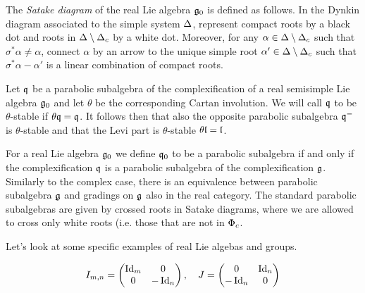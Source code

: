 The \emph{Satake diagram} of the real Lie algebra $\mathfrak{g}_0$ is defined as follows. In the Dynkin diagram associated to the simple system $\Delta$, represent compact roots by a black dot and roots in $\Delta\setminus\Delta_c$ by a white dot. Moreover, for any $\alpha\in\Delta\setminus\Delta_c$ such that $\sigma^*\alpha\neq\alpha$, connect $\alpha$ by an arrow  to the unique simple root $\alpha'\in\Delta\setminus\Delta_c$ such that $\sigma^*\alpha -\alpha'$ is a linear combination of compact roots.




\begin{definition}\label{def:thetastableparabolic}
 Let $\mathfrak{q}$ be a parabolic subalgebra of the complexification of a real semisimple Lie algebra $\mathfrak{g}_0$ and let $\theta$ be the corresponding Cartan involution. We will call $\mathfrak{q}$ to be $\theta$-stable if $\theta \mathfrak{q} = \mathfrak{q}$. It follows then that also the opposite parabolic subalgebra $\mathfrak{q}^-$ is $\theta$-stable and that the Levi part is $\theta$-stable $\theta \mathfrak{l} = \mathfrak{l}$.
\end{definition}

For a real Lie algebra $\mathfrak{g}_0$ we define $\mathfrak{q}_0$ to be a parabolic subalgebra if and only if the complexification $\mathfrak{q}$ is a parabolic subalgebra of the complexification $\mathfrak{g}$. Similarly to the complex case, there is an equivalence between parabolic subalgebra $\mathfrak{g}$ and gradings on $\mathfrak{g}$ also in the real category. The standard parabolic subalgebras are given by crossed roots in Satake diagrams, where we are allowed to cross only white roots (i.e. those that are not in $\Phi_c$.


Let's look at some specific examples of real Lie algebas and groups.

\[
 I_{m,n} = \begin{pmatrix} \operatorname{\mathrm{Id}}_m & 0 \\ 0 & -\operatorname{\mathrm{Id}}_n \end{pmatrix}, \quad J = \begin{pmatrix} 0 & \operatorname{\mathrm{Id}}_n \\ -\operatorname{\mathrm{Id}}_n & 0 \end{pmatrix}
\]

